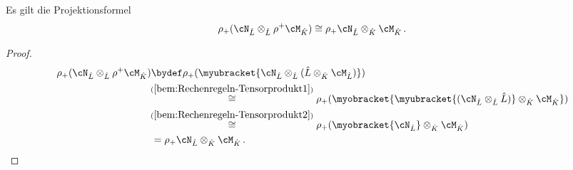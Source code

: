 \begin{thm} \label{thm:Projektionsformel}
\begin{comment}
\cite[1.a]{sabbah_Fourier-local}
\end{comment}
Es gilt die Projektionsformel
\begin{equation} \label{eq:Projektionsformel}
\rho_+(\cN_{\hat L}\otimes_{\hat L}\rho^+\cM_{\hat K}) \cong
\rho_+\cN_{\hat L}\otimes_{\hat K}\cM_{\hat K}\,.
\end{equation}
\end{thm}
\begin{proof}
\begin{align*}
\rho_+(\cN_{\hat L}\otimes_{\hat L}\rho^+\cM_{\hat K}) 
  &\bydef \rho_+(\myubracket{\cN_{\hat L}\otimes_{\hat L}(\hat L\otimes_{\hat
  K}\cM_{\hat L})}) \\
&\!\!\overset{(\ref{bem:Rechenregeln-Tensorprodukt1})}{\cong}
  \rho_+(\myobracket{\myubracket{(\cN_{\hat L}\otimes_{\hat L}\hat L)}
  \otimes_{\hat K}\cM_{\hat K}}) \\
&\!\!\overset{(\ref{bem:Rechenregeln-Tensorprodukt2})}{\cong}
  \rho_+(\myobracket{\cN_{\hat L}}\otimes_{\hat K}\cM_{\hat K}) \\
&= \rho_+\cN_{\hat L}\otimes_{\hat K}\cM_{\hat K} \,.
\end{align*}
\end{proof}


